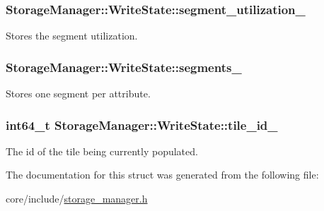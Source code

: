 \subsubsection[{segment\+\_\+utilization\+\_\+}]{ Storage\+Manager\+::\+Write\+State\+::segment\+\_\+utilization\+\_\+}\label{structStorageManager_1_1WriteState_a49054392be593764becbff60881c6f70}
Stores the segment utilization. \hypertarget{structStorageManager_1_1WriteState_a988a87b69e8faeacc8aeb3d705bc0d01}{}
\subsubsection[{segments\+\_\+}]{ Storage\+Manager\+::\+Write\+State\+::segments\+\_\+}\label{structStorageManager_1_1WriteState_a988a87b69e8faeacc8aeb3d705bc0d01}
Stores one segment per attribute. \hypertarget{structStorageManager_1_1WriteState_a3dd377d4143a3f30f8127b6675818aad}{}
\subsubsection[{tile\+\_\+id\+\_\+}]{\setlength{\rightskip}{0pt plus 5cm}int64\+\_\+t Storage\+Manager\+::\+Write\+State\+::tile\+\_\+id\+\_\+}\label{structStorageManager_1_1WriteState_a3dd377d4143a3f30f8127b6675818aad}
The id of the tile being currently populated. 

The documentation for this struct was generated from the following file\+:\begin{DoxyCompactItemize}
\item 
core/include/\hyperlink{storage__manager_8h}{storage\+\_\+manager.\+h}\end{DoxyCompactItemize}
